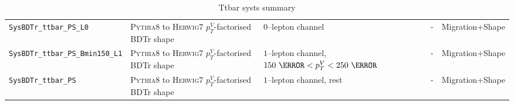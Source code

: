 \begin{table}[hbpt!]
{\begin{tabular}{lllll}
      \texttt{SysBDTr\_ttbar\_PS\_L0} & \textsc{Pythia8} to \textsc{Herwig7} $p_T^V$-factorised BDTr shape  & $0$--lepton channel & - & Migration+Shape \\
      \texttt{SysBDTr\_ttbar\_PS\_Bmin150\_L1} & \textsc{Pythia8} to \textsc{Herwig7} $p_T^V$-factorised BDTr shape  & $1$--lepton channel, $150~\GeV< p_T^V <250~\GeV$ & - & Migration+Shape \\
      \texttt{SysBDTr\_ttbar\_PS} & \textsc{Pythia8} to \textsc{Herwig7} $p_T^V$-factorised BDTr shape  & $1$--lepton channel, rest & - & Migration+Shape \\
\bottomrule
\end{tabular}
}
\caption[A summary of systematic uncertainties on the $t\bar{t}$ process.]{Ttbar
  systs summary}
\label{tab:ttbar-systs}
\end{table}